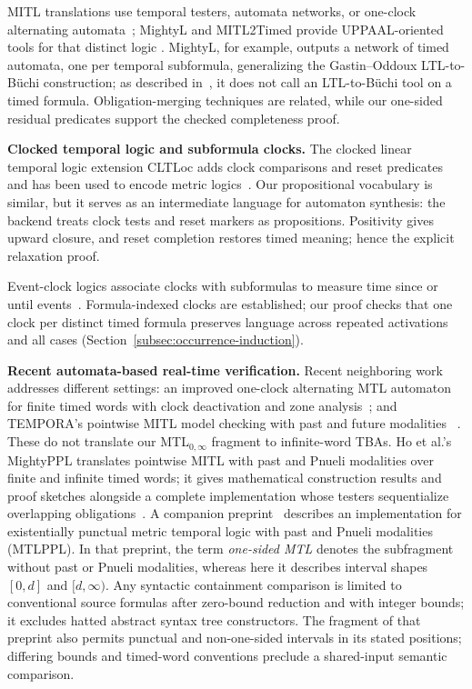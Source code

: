\documentclass{ieeeaccess}
\newcommand{\runinhead}[1]{\par\noindent\textbf{#1}\enspace}
\begin{document}
MITL translations use temporal testers, automata networks, or one-clock
alternating automata~\cite{maler_mitl_to_ta,
ferrere2019_realtimelogic_to_ta,[BM14]}; MightyL and MITL2Timed provide
UPPAAL-oriented tools for that distinct logic
\cite{mightyl_paper17,mitl2timed_github}. MightyL, for example, outputs a
network of timed automata, one per temporal subformula, generalizing the
Gastin--Oddoux LTL-to-B\"uchi construction; as described in~\cite{mightyl_paper17}, it does not call an LTL-to-B\"uchi
tool on a timed formula. Obligation-merging techniques are
related, while our one-sided residual predicates support the checked
completeness proof.

\runinhead{Clocked temporal logic and subformula clocks.}
The clocked linear temporal logic extension CLTLoc adds clock comparisons and reset predicates and has been used to
encode metric logics~\cite{bersani_cltloc}. Our propositional vocabulary
is similar, but it serves as an intermediate language for automaton synthesis: the backend treats clock
tests and reset markers as propositions. Positivity gives upward closure, and
reset completion restores timed meaning; hence the explicit relaxation proof.

Event-clock logics associate clocks with subformulas to measure time since or
until events~\cite{afh_eventclock_tcs99,
raskin_schobbens_jalc99,nickovic_piterman_formats10}. Formula-indexed clocks
are established; our proof checks that one clock per distinct timed formula
preserves language across repeated activations and all
cases (Section~\ref{subsec:occurrence-induction}).

\runinhead{Recent automata-based real-time verification.}
Recent neighboring work addresses different settings: an improved one-clock
alternating MTL automaton for finite timed words with clock deactivation and
zone analysis~\cite{bouyer_srivathsan_vishwanath_fossacs25}; and TEMPORA's
pointwise MITL model checking with past and future modalities
~\cite{akshay_et_al_tempora26}. These do not
translate our MTL$_{0,\infty}$ fragment to infinite-word TBAs.
Ho et al.'s MightyPPL translates pointwise MITL with past and Pnueli
modalities over finite and infinite timed words; it gives mathematical
construction results and proof sketches alongside a complete implementation
whose testers sequentialize overlapping obligations~\cite{mightyppl_tacas26}. A companion
preprint~\cite{mightyppl_qest_arxiv26} describes
an implementation for existentially punctual metric temporal logic with past
and Pnueli modalities (MTLPPL). In that preprint, the term
\emph{one-sided MTL} denotes the subfragment without past or Pnueli modalities, whereas
here it describes interval shapes $[0,d]$ and $[d,\infty)$. Any syntactic
containment comparison is limited to conventional source formulas after
zero-bound reduction and with integer bounds; it excludes hatted abstract syntax tree
constructors. The fragment of that preprint also permits punctual and non-one-sided
intervals in its stated positions; differing bounds and timed-word
conventions preclude a shared-input semantic comparison.
\end{document}
